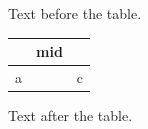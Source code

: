 \documentclass[12pt]{article}
\begin{document}
Text before the table.

\begin{tabular}{|l|c|r|}\hline & mid & \\\hline a & & c\\\hline\end{tabular}

Text after the table.
\end{document}

